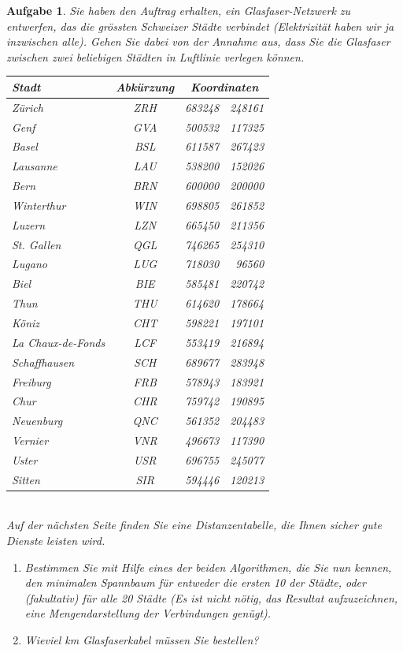 \documentclass[12pt,a4paper]{report}
\theoremstyle{break}
\newtheorem{exercise}{Aufgabe}[chapter]
\theoremstyle{plain}
\begin{document}
\begin{exercise}
Sie haben den Auftrag erhalten, ein Glasfaser-Netzwerk zu entwerfen,
das die gr\"{o}ssten Schweizer St\"{a}dte verbindet
(Elektrizit\"{a}t haben wir ja inzwischen alle). Gehen Sie dabei von
der Annahme aus, dass Sie die Glasfaser zwischen zwei beliebigen St\"{a}dten in
Luftlinie verlegen k\"{o}nnen.\\

\begin{tabular}{|l|c|r@{ / }r|}\hline
  Stadt & Abk\"{u}rzung & \multicolumn{2}{c|}{Koordinaten} \\
  \hline
  Z\"{u}rich & ZRH & 683248 & 248161 \\
  Genf &         GVA & 500532 & 117325 \\
  Basel &        BSL & 611587 & 267423 \\
  Lausanne & LAU & 538200 & 152026 \\
  Bern &         BRN & 600000 & 200000 \\
  Winterthur & WIN & 698805 & 261852 \\
  Luzern &     LZN & 665450 &  211356 \\
  St. Gallen & QGL & 746265 & 254310 \\
  Lugano &    LUG & 718030 & 96560 \\
  Biel &          BIE  & 585481 & 220742 \\
  \hline
  Thun &       THU & 614620 & 178664 \\
  K\"{o}niz & CHT & 598221 & 197101 \\
  La Chaux-de-Fonds & LCF & 553419 & 216894 \\
  Schaffhausen & SCH & 689677 & 283948 \\
  Freiburg & FRB & 578943 & 183921 \\
  Chur & CHR & 759742 & 190895 \\
  Neuenburg & QNC & 561352 & 204483 \\
  Vernier & VNR & 496673 & 117390 \\
  Uster & USR & 696755 & 245077 \\
  Sitten & SIR & 594446 & 120213 \\
  \hline
\end{tabular}\\

Auf der n\"achsten Seite finden Sie eine Distanzentabelle, die Ihnen
sicher gute Dienste leisten wird. 

\begin{enumerate}
\item Bestimmen Sie mit Hilfe eines der
beiden Algorithmen, die Sie nun kennen, den minimalen Spannbaum
f\"{u}r entweder die ersten 10 der St\"{a}dte, oder (fakultativ)
f\"{u}r alle 20 St\"{a}dte (Es ist nicht n\"{o}tig, das Resultat
aufzuzeichnen, eine Mengendarstellung der Verbindungen gen\"{u}gt).
\item Wieviel km Glasfaserkabel m\"{u}ssen Sie bestellen?
\end{enumerate}

\end{exercise}
\end{document}
